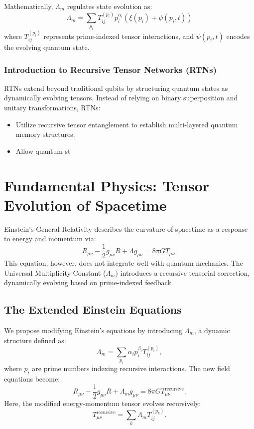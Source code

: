 \documentclass{article}
\theoremstyle{plain}
\begin{document}
Mathematically, $\Lambda_m$ regulates state evolution as:
\begin{equation}
    \Lambda_m = \sum_{p_i} T_{ij}^{(p_i)} p_i^{\alpha_i} \left( \xi(p_i) + \psi(p_i, t) \right)
\end{equation}
where $T_{ij}^{(p_i)}$ represents prime-indexed tensor interactions, and $\psi(p_i, t)$ encodes the evolving quantum state.

\subsubsection{Introduction to Recursive Tensor Networks (RTNs)}

RTNs extend beyond traditional qubits by structuring quantum states as dynamically evolving tensors. Instead of relying on binary superposition and unitary transformations, RTNs:
\begin{itemize}
    \item Utilize recursive tensor entanglement to establish multi-layered quantum memory structures.
    \item Allow quantum st
\end{itemize}
\section{Fundamental Physics: Tensor Evolution of Spacetime}
Einstein's General Relativity describes the curvature of spacetime as a response to energy and momentum via:
\begin{equation}
    R_{\mu\nu} - \frac{1}{2} g_{\mu\nu} R + \Lambda g_{\mu\nu} = 8\pi G T_{\mu\nu}.
\end{equation}
This equation, however, does not integrate well with quantum mechanics. The Universal Multiplicity Constant ($\Lambda_m$) introduces a recursive tensorial correction, dynamically evolving based on prime-indexed feedback.

\subsection{The Extended Einstein Equations}
We propose modifying Einstein’s equations by introducing $\Lambda_m$, a dynamic structure defined as:
\begin{equation}
    \Lambda_m = \sum_{p_i} \alpha_i p_i^{\beta_i} T_{ij}^{(p_i)},
\end{equation}
where $p_i$ are prime numbers indexing recursive interactions.
The new field equations become:
\begin{equation}
    R_{\mu\nu} - \frac{1}{2} g_{\mu\nu} R + \Lambda_m g_{\mu\nu} = 8\pi G T_{\mu\nu}^{\text{recursive}}.
\end{equation}
Here, the modified energy-momentum tensor evolves recursively:
\begin{equation}
    T_{\mu\nu}^{\text{recursive}} = \sum_{k} \Lambda_m T_{ij}^{(p_k)}.
\end{equation}
\end{document}
